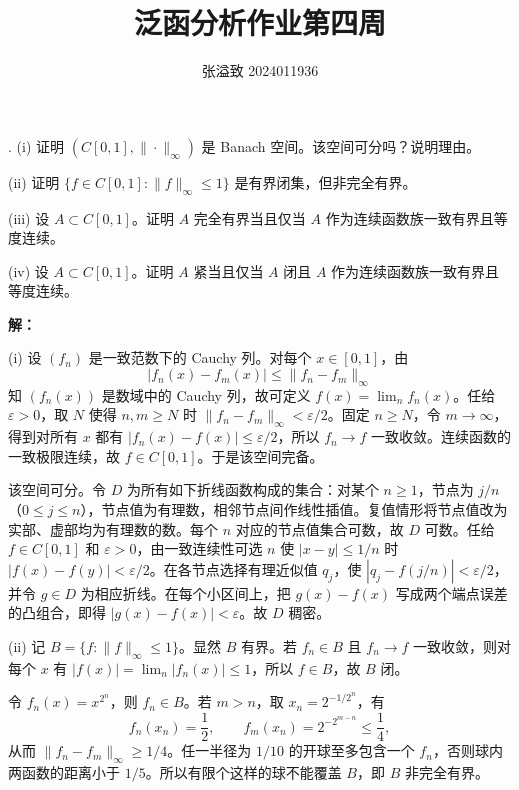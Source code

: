 \documentclass{article}
\title{泛函分析作业第四周}
\author{张溢致 2024011936}
\date{}
\begin{document}
\maketitle

\par\medskip{}. (i) 证明 $(C[0,1],\|\cdot\|_\infty)$ 是 Banach 空间。该空间可分吗？说明理由。

(ii) 证明 $\{f\in C[0,1]:\|f\|_\infty\le1\}$ 是有界闭集，但非完全有界。

(iii) 设 $A\subset C[0,1]$。证明 $A$ 完全有界当且仅当 $A$ 作为连续函数族一致有界且等度连续。

(iv) 设 $A\subset C[0,1]$。证明 $A$ 紧当且仅当 $A$ 闭且 $A$ 作为连续函数族一致有界且等度连续。


\par{}\noindent\textbf{解：}\par\nopagebreak[4]



(i) 设 $(f_n)$ 是一致范数下的 Cauchy 列。对每个 $x\in[0,1]$，由
\[
|f_n(x)-f_m(x)|\le\|f_n-f_m\|_\infty
\]
知 $(f_n(x))$ 是数域中的 Cauchy 列，故可定义 $f(x)=\lim_n f_n(x)$。任给 $\varepsilon>0$，取 $N$ 使得 $n,m\ge N$ 时 $\|f_n-f_m\|_\infty<\varepsilon/2$。固定 $n\ge N$，令 $m\to\infty$，得到对所有 $x$ 都有 $|f_n(x)-f(x)|\le\varepsilon/2$，所以 $f_n\to f$ 一致收敛。连续函数的一致极限连续，故 $f\in C[0,1]$。于是该空间完备。

该空间可分。令 $D$ 为所有如下折线函数构成的集合：对某个 $n\ge1$，节点为 $j/n$（$0\le j\le n$），节点值为有理数，相邻节点间作线性插值。复值情形将节点值改为实部、虚部均为有理数的数。每个 $n$ 对应的节点值集合可数，故 $D$ 可数。任给 $f\in C[0,1]$ 和 $\varepsilon>0$，由一致连续性可选 $n$ 使 $|x-y|\le1/n$ 时 $|f(x)-f(y)|<\varepsilon/2$。在各节点选择有理近似值 $q_j$，使 $|q_j-f(j/n)|<\varepsilon/2$，并令 $g\in D$ 为相应折线。在每个小区间上，把 $g(x)-f(x)$ 写成两个端点误差的凸组合，即得 $|g(x)-f(x)|<\varepsilon$。故 $D$ 稠密。

(ii) 记 $B=\{f:\|f\|_\infty\le1\}$。显然 $B$ 有界。若 $f_n\in B$ 且 $f_n\to f$ 一致收敛，则对每个 $x$ 有 $|f(x)|=\lim_n|f_n(x)|\le1$，所以 $f\in B$，故 $B$ 闭。

令 $f_n(x)=x^{2^n}$，则 $f_n\in B$。若 $m>n$，取 $x_n=2^{-1/2^n}$，有
\[
f_n(x_n)=\frac12,\qquad f_m(x_n)=2^{-2^{m-n}}\le\frac14,
\]
从而 $\|f_n-f_m\|_\infty\ge1/4$。任一半径为 $1/10$ 的开球至多包含一个 $f_n$，否则球内两函数的距离小于 $1/5$。所以有限个这样的球不能覆盖 $B$，即 $B$ 非完全有界。
\end{document}
